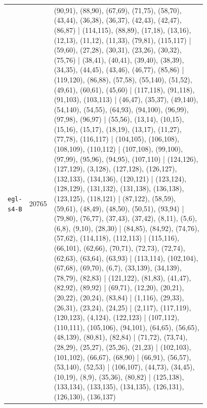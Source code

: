 \begin{landscape}
\begin{longtable}{lr>{\tiny\raggedright\arraybackslash}p{0.78\linewidth}}
\texttt{egl-s4-B} & 20765 & (90,91), (88,90), (67,69), (71,75), (58,70), (43,44), (36,38), (36,37), (42,43), (42,47), (86,87) | (114,115), (88,89), (17,18), (13,16), (12,13), (11,12), (11,33), (79,81), (115,117) | (59,60), (27,28), (30,31), (23,26), (30,32), (75,76) | (38,41), (40,41), (39,40), (38,39), (34,35), (44,45), (43,46), (46,77), (85,86) | (119,120), (86,88), (57,58), (55,140), (51,52), (49,61), (60,61), (45,60) | (117,118), (91,118), (91,103), (103,113) | (46,47), (35,37), (49,140), (54,140), (54,55), (64,93), (94,100), (96,99), (97,98), (96,97) | (55,56), (13,14), (10,15), (15,16), (15,17), (18,19), (13,17), (11,27), (77,78), (116,117) | (104,105), (106,108), (108,109), (110,112) | (107,108), (99,100), (97,99), (95,96), (94,95), (107,110) | (124,126), (127,129), (3,128), (127,128), (126,127), (132,133), (134,136), (120,121) | (123,124), (128,129), (131,132), (131,138), (136,138), (123,125), (118,121) | (87,122), (58,59), (59,61), (48,49), (48,50), (50,51), (93,94) | (79,80), (76,77), (37,43), (37,42), (8,11), (5,6), (6,8), (9,10), (28,30) | (84,85), (84,92), (74,76), (57,62), (114,118), (112,113) | (115,116), (66,101), (62,66), (70,71), (72,73), (72,74), (62,63), (63,64), (63,93) | (113,114), (102,104), (67,68), (69,70), (6,7), (33,139), (34,139), (78,79), (82,83) | (121,122), (81,83), (41,47), (82,92), (89,92) | (69,71), (12,20), (20,21), (20,22), (20,24), (83,84) | (1,116), (29,33), (26,31), (23,24), (24,25) | (2,117), (117,119), (120,123), (4,124), (122,123) | (107,112), (110,111), (105,106), (94,101), (64,65), (56,65), (48,139), (80,81), (82,84) | (71,72), (73,74), (28,29), (25,27), (25,26), (21,23) | (102,103), (101,102), (66,67), (68,90) | (66,91), (56,57), (53,140), (52,53) | (106,107), (44,73), (34,45), (10,19), (8,9), (35,36), (80,82) | (125,138), (133,134), (133,135), (134,135), (126,131), (126,130), (136,137) \\[2pt]

\end{longtable}
\end{landscape}
